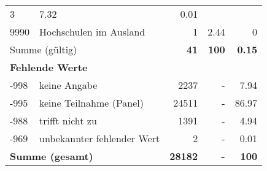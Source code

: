 \begin{longtable}{lXrrr}
       \num{3} &
       \num[round-mode=places,round-precision=2]{7,32} &
         \num[round-mode=places,round-precision=2]{0,01} \\

     9990 &
     \multicolumn{1}{X}{ Hochschulen im Ausland   } &


       \num{1} &
       \num[round-mode=places,round-precision=2]{2,44} &
         \num[round-mode=places,round-precision=2]{0} \\
     \midrule
     \multicolumn{2}{l}{Summe (gültig)} &
       \textbf{\num{41}} &
     \textbf{100} &
       \textbf{\num[round-mode=places,round-precision=2]{0,15}} \\
     \multicolumn{5}{l}{\textbf{Fehlende Werte}}\\
       -998 &
       keine Angabe &
         \num{2237} &
        - &
         \num[round-mode=places,round-precision=2]{7,94} \\
       -995 &
       keine Teilnahme (Panel) &
         \num{24511} &
        - &
         \num[round-mode=places,round-precision=2]{86,97} \\
       -988 &
       trifft nicht zu &
         \num{1391} &
        - &
         \num[round-mode=places,round-precision=2]{4,94} \\
       -969 &
       unbekannter fehlender Wert &
         \num{2} &
        - &
         \num[round-mode=places,round-precision=2]{0,01} \\
     \midrule
     \multicolumn{2}{l}{\textbf{Summe (gesamt)}} &
          \textbf{\num{28182}} &
        \textbf{-} &
        \textbf{100} \\
     \bottomrule
     \end{longtable}
     
